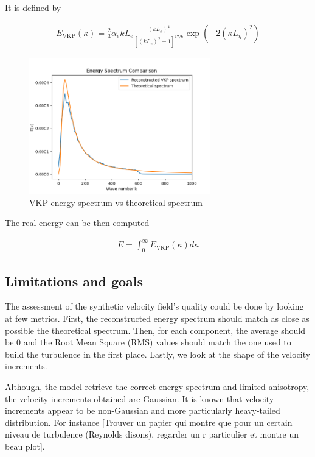\documentclass[a4paper,12pt]{article}
\theoremstyle{definition}
\begin{document}
It is defined by 

\begin{align}
    E_{\text{VKP}}(\kappa)=\frac{2}{3}\alpha_e k L_e \frac{(kL_e)^4}{[(kL_e)^2+1]^{17/6}}\exp(-2(\kappa L_\eta)^2)
\end{align}

\begin{figure}[H]
    \centering
    \includegraphics[width=0.7\textwidth]{illustrations/Energy_Spectrum_VKP.png}
    \caption{VKP energy spectrum vs theoretical spectrum}
\end{figure}

The real energy can be then computed 

\begin{align}
    E = \int_{0}^{\infty}E_{\text{VKP}}(\kappa) d\kappa
\end{align}

\subsection{Limitations and goals}
The assessment of the synthetic velocity field's quality could be done by looking at few metrics. First, the reconstructed energy spectrum should match as close as possible the theoretical spectrum. Then, for each component, the average should be 0 and the Root Mean Square (RMS) values should match the one used to build the turbulence in the first place. Lastly, we look at the shape of the velocity increments.   

\bigskip
Although, the model retrieve the correct energy spectrum and limited anisotropy, the velocity increments obtained are Gaussian. It is known that velocity increments appear to be non-Gaussian and more particularly heavy-tailed distribution. For instance \cite{} [Trouver un papier qui montre que pour un certain niveau de turbulence (Reynolds disons), regarder un r particulier et montre un beau plot].
\end{document}
